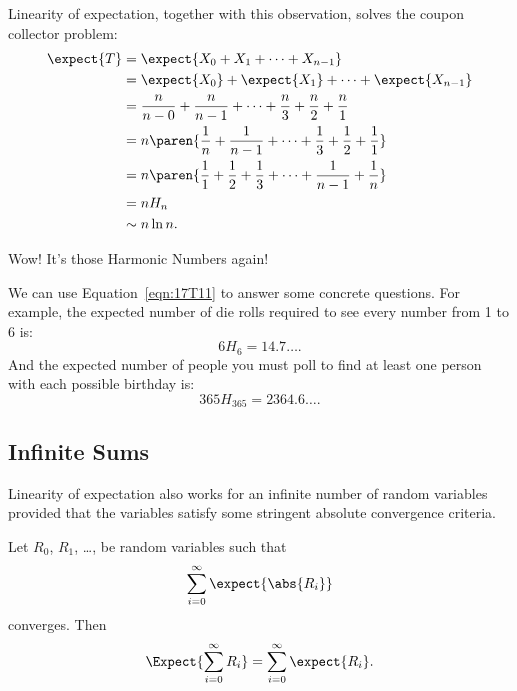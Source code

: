 Linearity of expectation, together with this observation, solves the
coupon collector problem:
%
\begingroup
\openup\jot
\begin{align}
\expect{T}
  & = \expect{X_0 + X_1 + \cdots + X_{n-1}} \notag\\
%
  & = \expect{X_0} + \expect{X_1} + \cdots + \expect{X_{n-1}} \notag\\
%
  & = \frac{n}{n - 0} + \frac{n}{n - 1} + \cdots + \frac{n}{3} +
    \frac{n}{2} + \frac{n}{1} \notag\\
%
  & = n \paren{\frac{1}{n} + \frac{1}{n-1} + \cdots + \frac{1}{3} +
  \frac{1}{2} + \frac{1}{1}} \notag\\
%
  &= n \paren{\frac{1}{1} + \frac{1}{2} + \frac{1}{3} + \cdots +
      \frac{1}{n-1} + \frac{1}{n}} \notag\\
%
  & = n H_n \\
  & \sim n \ln n. \label{eqn:17T11}
\end{align}
\endgroup

Wow!  It's those Harmonic Numbers again!  

We can use Equation~\ref{eqn:17T11} to answer some concrete questions.
For example, the expected number of die rolls required to see every
number from 1 to 6 is:
%
\[
    6 H_6 = 14.7 \dots.
\]
%
And the expected number of people you must poll to find at least one
person with each possible birthday is:
%
\[
    365 H_{365} = 2364.6\dots.
\]


\subsection{Infinite Sums}

Linearity of expectation also works for an infinite number of random
variables provided that the variables satisfy some stringent absolute
convergence criteria.

\begin{theorem}\label{linexp}
Let $R_0$, $R_1$, \dots, be random variables such that
\[
\sum_{i = 0}^\infty \expect{\abs{R_i}}
\]
converges.  Then
\[
   \Expect{\sum_{i = 0}^\infty R_i} = \sum_{i = 0}^\infty \expect{R_i}.
\]
\end{theorem}


